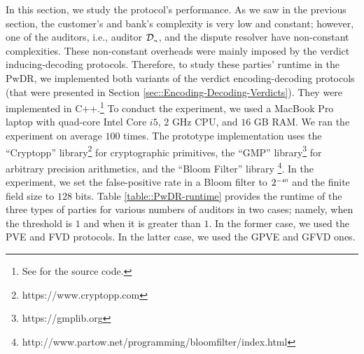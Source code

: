In this section, we study the  protocol's performance.   As we saw  in the previous section, the customer's and bank's complexity is very low and constant; however, one of the auditors, i.e., auditor $\mathcal{D}_{\scriptscriptstyle n}$, and the dispute resolver have non-constant complexities.  These non-constant  overheads were mainly imposed by the verdict inducing-decoding protocols. Therefore, to study these parties' runtime in the PwDR, we  implemented both variants of the verdict encoding-decoding protocols (that were presented in Section  \ref{sec::Encoding-Decoding-Verdicts}). They  were implemented in C++.\footnote{See  \cite{variant-1,variant-2}  for the source code.} To conduct the experiment, we used a MacBook Pro laptop with quad-core Intel Core $i5$, $2$ GHz CPU, and $16$ GB RAM. We ran the experiment on average $100$ times. The prototype implementation uses the ``Cryptopp'' library\footnote{https://www.cryptopp.com}  for cryptographic primitives, the ``GMP'' library\footnote{https://gmplib.org} for arbitrary precision arithmetics, and the ``Bloom Filter'' library \footnote{http://www.partow.net/programming/bloomfilter/index.html}. In the experiment, we set the false-positive rate in a Bloom filter to $2^{\scriptscriptstyle -40}$ and  the finite field size to $128$ bits. Table \ref{table::PwDR-runtime} provides the runtime of the three types of parties for various numbers of auditors in two cases; namely, when the threshold is $1$ and when it is greater than $1$. In the former case, we used the PVE and FVD protocols.  In the latter case, we used the GPVE and GFVD ones. 



%


